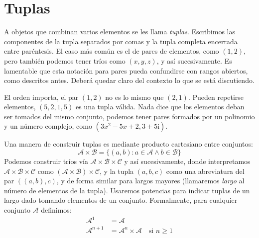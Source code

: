 \section{Tuplas}
\label{sec:tuplas}

  A objetos que combinan varios elementos
  se les llama \emph{tuplas}.
  Escribimos las componentes de la tupla separados por comas
  y la tupla completa encerrada entre paréntesis.
  El caso más común es el de pares de elementos,
  como \((1, 2)\),
  pero también podemos tener tríos como \((x, y, z)\),
  y así sucesivamente.
  Es lamentable que esta notación para pares
  pueda confundirse con rangos abiertos,
  como descritos antes.
  Deberá quedar claro del contexto lo que se está discutiendo.

  El orden importa,
  el par \((1, 2)\) no es lo mismo que \((2, 1)\).
  Pueden repetirse elementos,
  \((5, 2, 1, 5)\) es una tupla válida.
  Nada dice que los elementos deban ser tomados del mismo conjunto,
  podemos tener pares formados por un polinomio
  y un número complejo,
  como \((3x^2 - 5x + 2, 3 + 5 \mathrm{i})\).

  Una manera de construir tuplas
  es mediante producto cartesiano entre conjuntos:%
  \begin{equation*}
    \mathcal{A} \times \mathcal{B}
      = \{(a, b) \colon a \in \mathcal{A} \wedge b \in \mathcal{B}\}
  \end{equation*}
  Podemos construir tríos
  vía \(\mathcal{A} \times \mathcal{B} \times \mathcal{C}\)
  y así sucesivamente,
  donde interpretamos
    \(\mathcal{A} \times \mathcal{B} \times \mathcal{C}\)
  como \((\mathcal{A} \times \mathcal{B}) \times \mathcal{C}\),
  y la tupla \((a, b, c)\)
  como una abreviatura del par \(((a, b), c)\),
  y de forma similar para largos mayores
  (llamaremos \emph{largo} al número de elementos de la tupla).%
  Usaremos potencias para indicar tuplas de un largo dado
  tomando elementos de un conjunto.
  Formalmente,
  para cualquier conjunto \(\mathcal{A}\) definimos:
  \begin{equation}
    \label{eq:A^n}
    \begin{split}
      \mathcal{A}^1
	&= \mathcal{A} \\
      \mathcal{A}^{n + 1}
	&= \mathcal{A}^n \times \mathcal{A}
	     \quad \text{si \(n \ge 1\)}
    \end{split}
  \end{equation}


